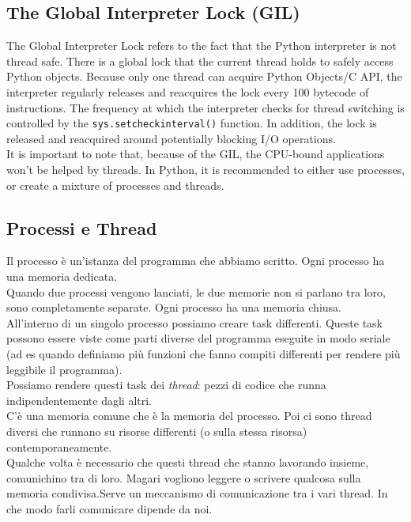 \subsection{The Global Interpreter Lock (GIL)}

The Global Interpreter Lock refers to the fact that the Python interpreter is not thread safe. There is a global lock that the current thread holds to safely access Python objects. Because only one thread can acquire Python Objects/C API, the interpreter regularly releases and reacquires the lock every 100 bytecode of instructions. The frequency at which the interpreter checks for thread switching is controlled by the
\texttt{sys.setcheckinterval()} function. In addition, the lock is released and reacquired around potentially blocking I/O operations.\\
It is important to note that, because of the GIL, the CPU-bound applications won't be helped by threads. In Python, it is recommended to either use processes, or create a mixture of processes and threads. \\

\subsection{Processi e Thread}
Il processo è un'istanza del programma che abbiamo scritto. Ogni processo ha una memoria dedicata.\\
Quando due processi vengono lanciati, le due memorie non si parlano tra loro, sono completamente separate. Ogni processo ha una memoria chiusa.\\

All'interno di un singolo processo possiamo creare task differenti. Queste task possono essere viste come parti diverse del programma eseguite in modo seriale (ad es quando definiamo più funzioni che fanno compiti differenti per rendere più leggibile il programma).\\
Possiamo rendere questi task dei \textit{thread}: pezzi di codice che runna indipendentemente dagli altri.\\
C'è una memoria comune che è la memoria del processo. Poi ci sono thread diversi che runnano su risorse differenti (o sulla stessa risorsa) contemporaneamente.\\

Qualche volta è necessario che questi thread che stanno lavorando insieme, comunichino tra di loro. Magari vogliono leggere o scrivere qualcosa sulla memoria condivisa.Serve un meccanismo di comunicazione tra i vari thread. In che modo farli comunicare dipende da noi.\\


